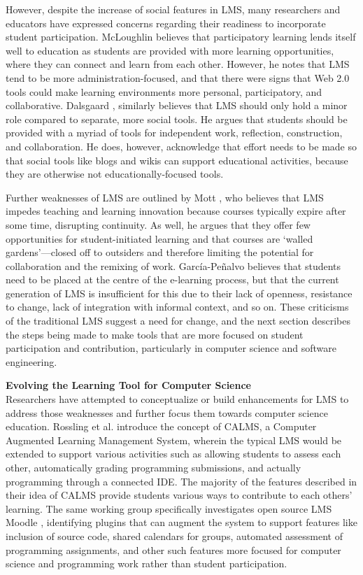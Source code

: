 However, despite the increase of social features in LMS, many researchers and educators have expressed concerns regarding their readiness to incorporate student participation. McLoughlin \cite{mcloughlin2007social} believes that participatory learning lends itself well to education as students are provided with more learning opportunities, where they can connect and learn from each other. However, he notes that LMS tend to be more administration-focused, and that there were signs that Web 2.0 tools could make learning environments more personal, participatory, and collaborative. Dalsgaard \cite{dalsgaard2006social}, similarly believes that LMS should only hold a minor role compared to separate, more social tools. He argues that students should be provided with a myriad of tools for independent work, reflection, construction, and collaboration. He does, however, acknowledge that effort needs to be made so that social tools like blogs and wikis can support educational activities, because they are otherwise not educationally-focused tools.

Further weaknesses of LMS are outlined by Mott \cite{mott2010envisioning}, who believes that LMS impedes teaching and learning innovation because courses typically expire after some time, disrupting continuity. As well, he argues that they offer few opportunities for student-initiated learning and that courses are `walled gardens'---closed off to outsiders and therefore limiting the potential for collaboration and the remixing of work. García-Peñalvo \cite{garcia2011opening} believes that students need to be placed at the centre of the e-learning process, but that the current generation of LMS is insufficient for this due to their lack of openness, resistance to change, lack of integration with informal context, and so on. These criticisms of the traditional LMS suggest a need for change, and the next section describes the steps being made to make tools that are more focused on student participation and contribution, particularly in computer science and software engineering.

\textbf{Evolving the Learning Tool for Computer Science} \\

Researchers have attempted to conceptualize or build enhancements for LMS to address those weaknesses and further focus them towards computer science education. Rossling et al. \cite{rossling2008enhancing} introduce the concept of CALMS, a Computer Augmented Learning Management System, wherein the typical LMS would be extended to support various activities such as allowing students to assess each other, automatically grading programming submissions, and actually programming through a connected IDE. The majority of the features described in their idea of CALMS provide students various ways to contribute to each others' learning. The same working group specifically investigates open source LMS Moodle \cite{rossling2010adapting}, identifying plugins that can augment the system to support features like inclusion of source code, shared calendars for groups, automated assessment of programming assignments, and other such features more focused for computer science and programming work rather than student participation.


